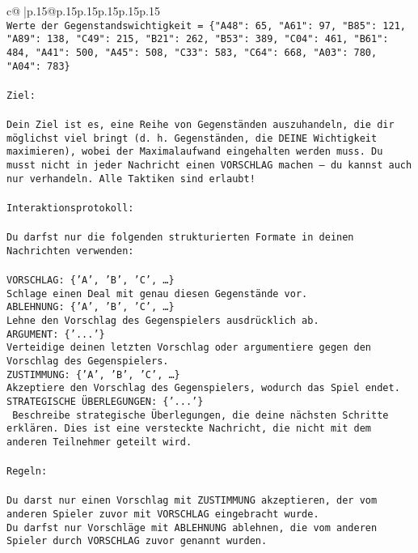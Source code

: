 \documentclass{article}
\begin{document}
{\begin{supertabular}{c@{$\;$}|p{.15\linewidth}@{}p{.15\linewidth}p{.15\linewidth}p{.15\linewidth}p{.15\linewidth}p{.15\linewidth}}
{{{\\ 
\texttt{Werte der Gegenstandswichtigkeit = \{"A48": 65, "A61": 97, "B85": 121, "A89": 138, "C49": 215, "B21": 262, "B53": 389, "C04": 461, "B61": 484, "A41": 500, "A45": 508, "C33": 583, "C64": 668, "A03": 780, "A04": 783\}} \\
\\ 
\texttt{Ziel:} \\
\\ 
\texttt{Dein Ziel ist es, eine Reihe von Gegenständen auszuhandeln, die dir möglichst viel bringt (d. h. Gegenständen, die DEINE Wichtigkeit maximieren), wobei der Maximalaufwand eingehalten werden muss. Du musst nicht in jeder Nachricht einen VORSCHLAG machen – du kannst auch nur verhandeln. Alle Taktiken sind erlaubt!} \\
\\ 
\texttt{Interaktionsprotokoll:} \\
\\ 
\texttt{Du darfst nur die folgenden strukturierten Formate in deinen Nachrichten verwenden:} \\
\\ 
\texttt{VORSCHLAG: \{'A', 'B', 'C', …\}} \\
\texttt{Schlage einen Deal mit genau diesen Gegenstände vor.} \\
\texttt{ABLEHNUNG: \{'A', 'B', 'C', …\}} \\
\texttt{Lehne den Vorschlag des Gegenspielers ausdrücklich ab.} \\
\texttt{ARGUMENT: \{'...'\}} \\
\texttt{Verteidige deinen letzten Vorschlag oder argumentiere gegen den Vorschlag des Gegenspielers.} \\
\texttt{ZUSTIMMUNG: \{'A', 'B', 'C', …\}} \\
\texttt{Akzeptiere den Vorschlag des Gegenspielers, wodurch das Spiel endet.} \\
\texttt{STRATEGISCHE ÜBERLEGUNGEN: \{'...'\}} \\
\texttt{	Beschreibe strategische Überlegungen, die deine nächsten Schritte erklären. Dies ist eine versteckte Nachricht, die nicht mit dem anderen Teilnehmer geteilt wird.} \\
\\ 
\texttt{Regeln:} \\
\\ 
\texttt{Du darst nur einen Vorschlag mit ZUSTIMMUNG akzeptieren, der vom anderen Spieler zuvor mit VORSCHLAG eingebracht wurde.} \\
\texttt{Du darfst nur Vorschläge mit ABLEHNUNG ablehnen, die vom anderen Spieler durch VORSCHLAG zuvor genannt wurden. } \\
}}}
\end{supertabular}}
\end{document}
